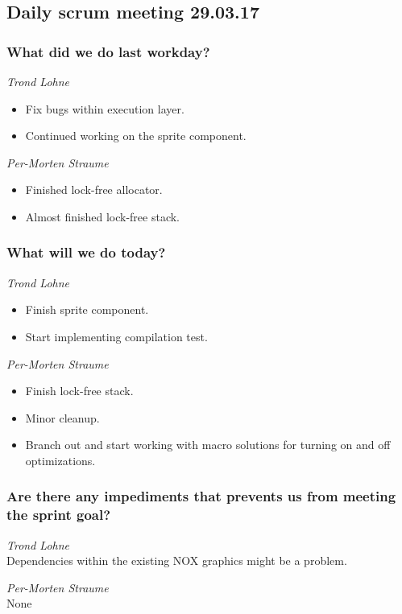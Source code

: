 \documentclass{article}
\begin{document}
\begin{center}
\subsection*{Daily scrum meeting 29.03.17}
\end{center}
\bigskip


\subsubsection*{What did we do last workday?}

\noindent\textit{Trond Lohne}
\begin{itemize}
	\item 
	Fix bugs within execution layer.
	
	\item 
	Continued working on the sprite component.
\end{itemize}

\medskip

\noindent\textit{Per-Morten Straume}
\begin{itemize}
	\item 
	Finished lock-free allocator.
	
	\item 
	Almost finished lock-free stack.
\end{itemize}


\subsubsection*{What will we do today?}

\noindent\textit{Trond Lohne}
\begin{itemize}
	\item 
	Finish sprite component.
	
	\item 
	Start implementing compilation test.
\end{itemize}

\medskip

\noindent\textit{Per-Morten Straume}
\begin{itemize}
	\item 
    Finish lock-free stack.
	
	\item 
	Minor cleanup.
	
	\item 
	Branch out and start working with macro solutions for turning on and off optimizations.
\end{itemize}


\subsubsection*{Are there any impediments that prevents us from meeting the sprint goal?}

\noindent\textit{Trond Lohne}\\
Dependencies within the existing NOX graphics might be a problem.

\medskip

\noindent\textit{Per-Morten Straume}\\
None
\end{document}
